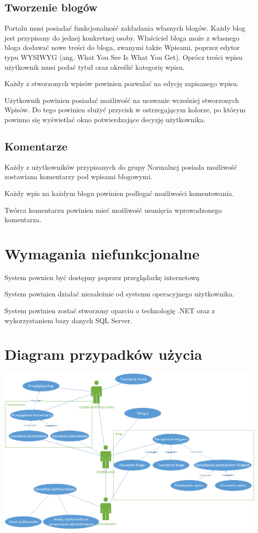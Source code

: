 \documentclass{article}
\begin{document}
\subsection{Tworzenie blogów}
Portalu musi posiadać funkcjonalność zakładania własnych blogów. Każdy blog jest przypisany do jednej konkretnej osoby. Właściciel bloga może z własnego bloga dodawać nowe treści do bloga, zwanymi także Wpisami, poprzez edytor typu WYSIWYG (ang. What You See Is What You Get). Oprócz treści wpisu użytkownik musi podać tytuł oraz określić kategorię wpisu.

Każdy z stworzonych wpisów powinien pozwalać na edycję zapisanego wpisu.

Użytkownik powinien posiadać możliwość na usuwanie wcześniej stworzonych Wpisów. Do tego powinien służyć przycisk w ostrzegającym kolorze, po którym powinno się wyświetlać okno potwierdzające decyzję użytkownika.

\subsection{Komentarze}
Każdy z użytkowników przypisanych do grupy Normalnej posiada możliwość zostawiana komentarzy pod wpisami blogowymi.

Każdy wpis na każdym blogu powinien podlegać możliwości komentowania.

Twórca komentarzu powinien mieć możliwość usunięcia wprowadzonego komentarza.

\section{Wymagania niefunkcjonalne}
System pownien być dostępny poprzez przeglądarkę internetową 

System powinien działać niezależnie od systemu operacyjnego użytkownika.

System powinien zostać stworzony oparciu o technologię .NET oraz z wykorzystaniem bazy danych SQL Server.


\section{Diagram przypadków użycia}
\includegraphics[width=\textwidth]{UseCaseDiagram}
\end{document}
